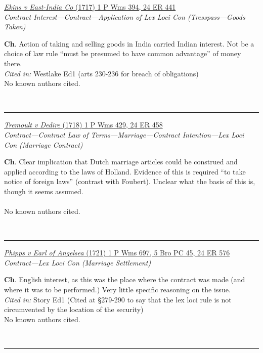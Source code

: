 \documentclass[twoside]{article}
\begin{document}
        \begin{small}
        \begin{center}
        \href{https://heinonline.org/HOL/P?h=hein.engrep/engrc0024&i=449}{\textit{Ekins v East-India Co} (1717) 1 P Wms 394, 24 ER 441} \label{19} \\ 
\textit{Contract Interest---Contract---Application of Lex Loci Con (Tresspass---Goods Taken)}\\
        \end{center}
        \textbf{Ch}. Action of taking and selling goods in India carried Indian interest. Not be a choice of law rule “must be presumed to have common advantage” of money there.\\\textit{Cited in: }Westlake Ed1 (arts 230-236 for breach of obligations)\\No known authors cited.
        \end{small}\\
        \rule{\textwidth}{0.5pt}
        

        \begin{small}
        \begin{center}
        \href{https://heinonline.org/HOL/P?h=hein.engrep/engrc0024&i=466}{\textit{Tremoult v Dedire} (1718) 1 P Wms 429, 24 ER 458} \label{28} \\ 
\textit{Contract---Contract Law of Terms---Marriage---Contract Intention---Lex Loci Con (Marriage Contract)}\\
        \end{center}
        \textbf{Ch}. Clear implication that Dutch marriage articles could be construed and applied according to the laws of Holland. Evidence of this is required “to take notice of foreign laws” (contrast with Foubert). Unclear what the basis of this is, though it seems assumed.\\\\No known authors cited.
        \end{small}\\
        \rule{\textwidth}{0.5pt}
        

        \begin{small}
        \begin{center}
        \href{https://heinonline.org/HOL/P?h=hein.engrep/engrc0024&i=584}{\textit{Phipps v Earl of Angelsea} (1721) 1 P Wms 697, 5 Bro PC 45, 24 ER 576} \label{31} \\ 
\textit{Contract---Lex Loci Con (Marriage Settlement)}\\
        \end{center}
        \textbf{Ch}. English interest, as this was the place where the contract was made (and where it was to be performed.) Very little specific reasoning on the issue.\\\textit{Cited in: }Story Ed1 (Cited at §279-290 to say that the lex loci rule is not circumvented by the location of the security)\\No known authors cited.
        \end{small}\\
        \rule{\textwidth}{0.5pt}
        
\end{document}
